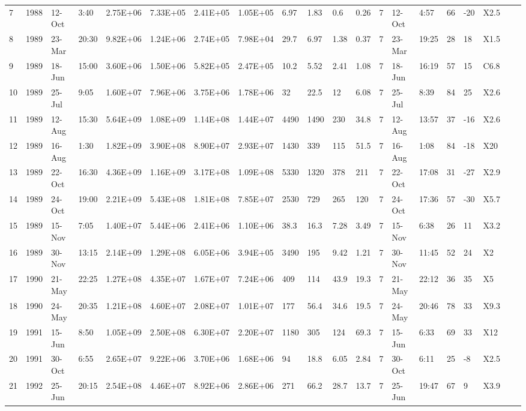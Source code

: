 \begin{tabular}{llllllllllllllllllll}
7 & 1988 & 12-Oct & 3:40 & 2.75E+06 & 7.33E+05 & 2.41E+05 & 1.05E+05 & 6.97 & 1.83 & 0.6 & 0.26 & 7 & 12-Oct & 4:57 & 66 & -20 & X2.5 &  &  \\
8 & 1989 & 23-Mar & 20:30 & 9.82E+06 & 1.24E+06 & 2.74E+05 & 7.98E+04 & 29.7 & 6.97 & 1.38 & 0.37 & 7 & 23-Mar & 19:25 & 28 & 18 & X1.5 &   &  \\
9 & 1989 & 18-Jun & 15:00 & 3.60E+06 & 1.50E+06 & 5.82E+05 & 2.47E+05 & 10.2 & 5.52 & 2.41 & 1.08 & 7 & 18-Jun & 16:19 & 57 & 15 & C6.8 &   &  \\
10 & 1989 & 25-Jul & 9:05 & 1.60E+07 & 7.96E+06 & 3.75E+06 & 1.78E+06 & 32 & 22.5 & 12 & 6.08 & 7 & 25-Jul & 8:39 & 84 & 25 & X2.6 &  &    \\
11 & 1989 & 12-Aug & 15:30 & 5.64E+09 & 1.08E+09 & 1.14E+08 & 1.44E+07 & 4490 & 1490 & 230 & 34.8 & 7 & 12-Aug & 13:57 & 37 & -16 & X2.6 &  &  \\
12 & 1989 & 16-Aug & 1:30 & 1.82E+09 & 3.90E+08 & 8.90E+07 & 2.93E+07 & 1430 & 339 & 115 & 51.5 & 7 & 16-Aug & 1:08 & 84 & -18 & X20 &  &  \\
13 & 1989 & 22-Oct & 16:30 & 4.36E+09 & 1.16E+09 & 3.17E+08 & 1.09E+08 & 5330 & 1320 & 378 & 211 & 7 & 22-Oct & 17:08 & 31 & -27 & X2.9 &  &  \\
14 & 1989 & 24-Oct & 19:00 & 2.21E+09 & 5.43E+08 & 1.81E+08 & 7.85E+07 & 2530 & 729 & 265 & 120 & 7 & 24-Oct & 17:36 & 57 & -30 & X5.7 &   &  \\
15 & 1989 & 15-Nov & 7:05 & 1.40E+07 & 5.44E+06 & 2.41E+06 & 1.10E+06 & 38.3 & 16.3 & 7.28 & 3.49 & 7 & 15-Nov & 6:38 & 26 & 11 & X3.2 &   &  \\
16 & 1989 & 30-Nov & 13:15 & 2.14E+09 & 1.29E+08 & 6.05E+06 & 3.94E+05 & 3490 & 195 & 9.42 & 1.21 & 7 & 30-Nov & 11:45 & 52 & 24 & X2 &   &  \\
17 & 1990 & 21-May & 22:25 & 1.27E+08 & 4.35E+07 & 1.67E+07 & 7.24E+06 & 409 & 114 & 43.9 & 19.3 & 7 & 21-May & 22:12 & 36 & 35 & X5 &  &  \\
18 & 1990 & 24-May & 20:35 & 1.21E+08 & 4.60E+07 & 2.08E+07 & 1.01E+07 & 177 & 56.4 & 34.6 & 19.5 & 7 & 24-May & 20:46 & 78 & 33 & X9.3 &  &  \\
19 & 1991 & 15-Jun & 8:50 & 1.05E+09 & 2.50E+08 & 6.30E+07 & 2.20E+07 & 1180 & 305 & 124 & 69.3 & 7 & 15-Jun & 6:33 & 69 & 33 & X12 &  &   \\
20 & 1991 & 30-Oct & 6:55 & 2.65E+07 & 9.22E+06 & 3.70E+06 & 1.68E+06 & 94 & 18.8 & 6.05 & 2.84 & 7 & 30-Oct & 6:11 & 25 & -8 & X2.5 &  &  \\
21 & 1992 & 25-Jun & 20:15 & 2.54E+08 & 4.46E+07 & 8.92E+06 & 2.86E+06 & 271 & 66.2 & 28.7 & 13.7 & 7 & 25-Jun & 19:47 & 67 & 9 & X3.9 &  &  \\

\end{tabular}
